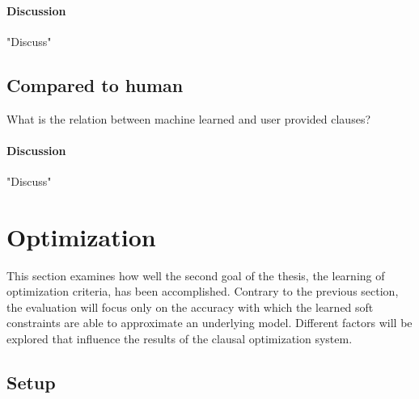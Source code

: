 
\paragraph{Discussion}
"Discuss"

\subsection{Compared to human}

\begin{question}
	What is the relation between machine learned and user provided clauses?
\end{question}


\paragraph{Discussion}
"Discuss"

\section{Optimization}
This section examines how well the second goal of the thesis, the learning of optimization criteria, has been accomplished.
Contrary to the previous section, the evaluation will focus only on the accuracy with which the learned soft constraints are able to approximate an underlying model.
Different factors will be explored that influence the results of the clausal optimization system.

\subsection{Setup}

